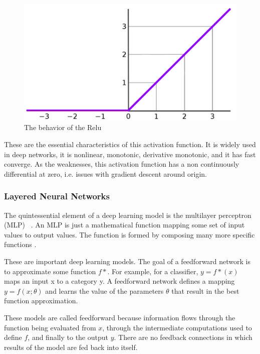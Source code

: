\begin{figure}[H]
\centering
\includegraphics[scale=0.2]{imagens/relu_corrected.png}
\caption{The behavior of the Relu \cite{lecture}}
\label{fig:relu}
\end{figure} 

These are the essential characteristics of this activation function. It is widely used in deep networks, it is nonlinear, monotonic, derivative monotonic, and it has fast converge. As the weaknesses, this activation function has a non continuously differential at zero, i.e. issues with gradient descent around origin.



\subsubsection{Layered Neural Networks}

The quintessential element of a deep learning model is the multilayer perceptron (MLP) ~\cite{goodfellow2016deep}. An MLP is just a mathematical function mapping some set of input values to output values. The function
is formed by composing many more specific functions \cite{goodfellow2016deep}.


These are important deep learning models. The goal
of a feedforward network is to approximate some function $f*$. For example, for a classifier, $y = f*(x)$ maps an input x to a category y. A feedforward network
defines a mapping $y = f (x; \theta)$ and learns the value of the parameters $\theta$ that result in the best function approximation.

These models are called feedforward because information flows through the function being evaluated from $x$, through the intermediate computations used to define $f$, and finally to the output $y$. There are no feedback connections in which results of the model are fed back into itself.




